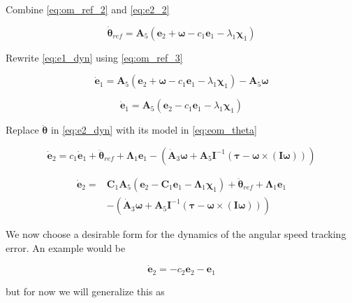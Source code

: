 Combine \eqref{eq:om_ref_2} and \eqref{eq:e2_2}

\begin{equation}
\dot{\boldsymbol\theta}_{ref} =
\mathbf{A}_5 \left( \mathbf{e}_2 + \boldsymbol\omega - c_1 \mathbf{e}_1 - \lambda_1 \boldsymbol\chi_1 \right)
\label{eq:om_ref_3}
\end{equation}

Rewrite \eqref{eq:e1_dyn} using \eqref{eq:om_ref_3}

\[
\dot{\mathbf{e}}_1 =
\mathbf{A}_5 \left( \mathbf{e}_2 + \boldsymbol\omega - c_1 \mathbf{e}_1 - \lambda_1 \boldsymbol\chi_1 \right) -
\mathbf{A}_5 \boldsymbol\omega
\]

\[
\dot{\mathbf{e}}_1 =
\mathbf{A}_5 \left( \mathbf{e}_2 - c_1 \mathbf{e}_1 - \lambda_1 \boldsymbol\chi_1 \right)
\]

Replace $\ddot{\boldsymbol\theta}$ in \eqref{eq:e2_dyn} with its model in \eqref{eq:eom_theta}

\begin{equation}
\dot{\mathbf{e}}_2 =
c_1 \dot{\mathbf{e}}_1 +
\ddot{\boldsymbol\theta}_{ref} +
\boldsymbol\Lambda_1 \mathbf{e}_1
- \left(
	\dot{\mathbf{A}}_3 \boldsymbol\omega
	+ \mathbf{A}_5 \mathbf{I}^{-1} \left( \boldsymbol\tau - \boldsymbol\omega \times \left( \mathbf{I} \boldsymbol\omega \right) \right)
\right)
\label{eq:}
\end{equation}


\begin{align}
\nonumber
\dot{\mathbf{e}}_2 = &
\mathbf{C}_1 \mathbf{A}_5 \left( \mathbf{e}_2 - \mathbf{C}_1 \mathbf{e}_1 - \boldsymbol\Lambda_1 \boldsymbol\chi_1 \right) +
\ddot{\boldsymbol\theta}_{ref} +
\boldsymbol\Lambda_1 \mathbf{e}_1 \\
&- \left(
	\dot{\mathbf{A}}_3 \boldsymbol\omega
	+ \mathbf{A}_5 \mathbf{I}^{-1} \left( \boldsymbol\tau - \boldsymbol\omega \times \left( \mathbf{I} \boldsymbol\omega \right) \right)
\right)
\label{eq:}
\end{align}

We now choose a desirable form for the dynamics of the angular speed tracking error. An example would be

\[
\dot{\mathbf{e}}_2 = -c_2 \mathbf{e}_2 - \mathbf{e}_1
\]

but for now we will generalize this as

